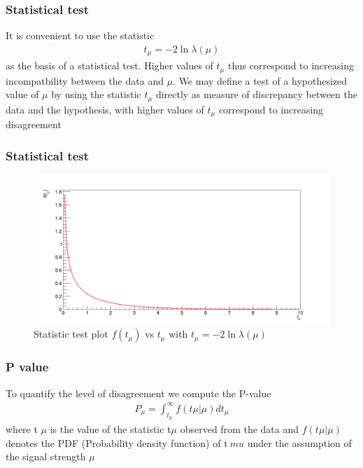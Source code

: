 \documentclass[11pt]{beamer}
\begin{document}
\begin{frame}
\frametitle{Statistical test}
It is convenient to use the statistic
\begin{align}
t_\mu=-2\ln{\lambda(\mu)} 
\end{align}
as the basis of a statistical test. Higher values of $t_\mu$ thus correspond to increasing
incompatbility between the data and $\mu$.
We may define a test of a hypothesized value of $\mu$ by using the statistic $t_\mu$ directly
as measure of discrepancy between the data and the hypothesis, with higher values of
$t_\mu$ correspond to increasing disagreement\cite{4}
\end{frame}

\begin{frame}
\frametitle{Statistical test}
\begin{center}
	\begin{figure}
\includegraphics[scale=0.25]{figures/tmu.png}
\caption{Statistic test plot $f(t_\mu)$ vs $t_\mu$ with $t_\mu=-2\ln{\lambda(\mu)}$}
\end{figure}
\end{center}
\end{frame}

\begin{frame}
\frametitle{P value}
To quantify the level of disagreement we compute the P-value
\begin{align}
P_\mu =\int_{t_\mu}^{\infty}f(t\mu |\mu) dt_\mu
\end{align}
where t $\mu$  is the value of the statistic t$\mu$ observed from the data and $f(t\mu |\mu)$ denotes
the PDF (Probability density function) of t$\	mu$ under the assumption of the signal strength $\mu$\cite{4}
\end{frame}
\end{document}
